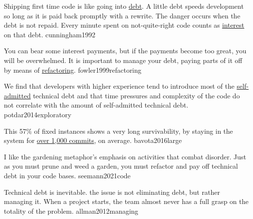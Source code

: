 \documentclass{article}
\begin{document}

  {Shipping first time code is like going into \ul{debt}. A little debt speeds development so long as it is paid back promptly with a rewrite. The danger occurs when the debt is not repaid. Every minute spent on not-quite-right code counts as \ul{interest} on that debt.}
  {cunningham1992}

  {You can bear some interest payments, but if the payments become too great, you will be overwhelmed. It is important to manage your debt, paying parts of it off by means of \ul{refactoring}.}
  {fowler1999refactoring}

  {We find that developers with higher experience tend to introduce most of the \ul{self-admitted} technical debt and that time pressures and complexity of the code do not correlate with the amount of self-admitted technical debt.}
  {potdar2014exploratory}

  {This 57\% of fixed instances shows a very long survivability, by staying in the system for \ul{over 1,000 commits}, on average.}
  {bavota2016large}

  {I like the gardening metaphor's emphasis on activities that combat disorder. Just as you must prune and weed a garden, you must refactor and pay off technical debt in your code bases.}
  {seemann2021code}


  {Technical debt is inevitable. the issue is not eliminating debt, but rather managing it. When a project starts, the team almost never has a full grasp on the totality of the problem.}
  {allman2012managing}
\end{document}
